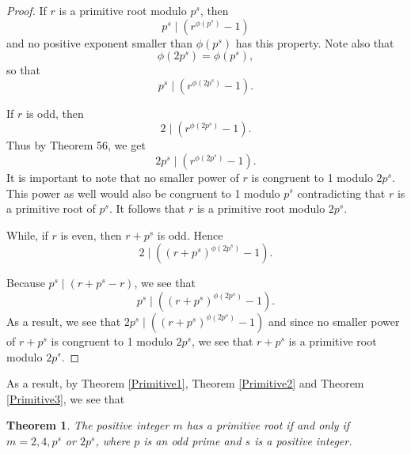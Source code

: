 \documentclass[12pt,letterpaper]{book}
\newtheorem{theorem}{Theorem}
\begin{document}
\begin{proof}
If $r$ is a primitive root modulo $p^s$, then
\begin{equation*}
p^s\mid (r^{\phi(p^s)}-1)
\end{equation*}
and no positive exponent smaller than $\phi(p^s)$ has this property.
Note also that
\begin{equation*}
\phi(2p^s)=\phi(p^s),
\end{equation*}
so that
\begin{equation*}
p^s\mid (r^{\phi(2p^s)}-1).
\end{equation*}
\par If $r$ is odd, then
\begin{equation*}
2\mid (r^{\phi(2p^s)}-1).
\end{equation*}
Thus by Theorem 56, we get
\begin{equation*}
2p^s\mid (r^{\phi(2p^s)}-1).
\end{equation*}
It is important to note that no smaller power of $r$ is congruent to
1 modulo $2p^s$. This power as well would also be congruent to 1
modulo $p^s$ contradicting that $r$ is a primitive root of $p^s$. It
follows that $r$ is a primitive root modulo $2p^s$.
\par While, if $r$ is even, then $r+p^s$ is odd.
Hence
\begin{equation*}
2\mid ((r+p^s)^{\phi(2p^s)}-1).
\end{equation*}



Because $p^s\mid (r+p^s-r)$, we see that
\begin{equation*}
p^s\mid ((r+p^s)^{\phi(2p^s)}-1).
\end{equation*}
As a result, we see that $2p^s\mid ((r+p^s)^{\phi(2p^s)}-1)$ and
since no smaller power of $r+p^s$ is congruent to 1 modulo
$2p^s$, we see that $r+p^s$ is a primitive root modulo $2p^s$.
\end{proof}

As a result, by Theorem \ref{Primitive1}, Theorem \ref{Primitive2} and Theorem \ref{Primitive3}, we see that

\begin{theorem}
The positive integer $m$ has a primitive root if and only if\\ $m=2,4,
p^s$ or $2p^s$, where $p$ is an odd prime and $s$ is a positive integer. \\

\end{theorem}
\end{document}
